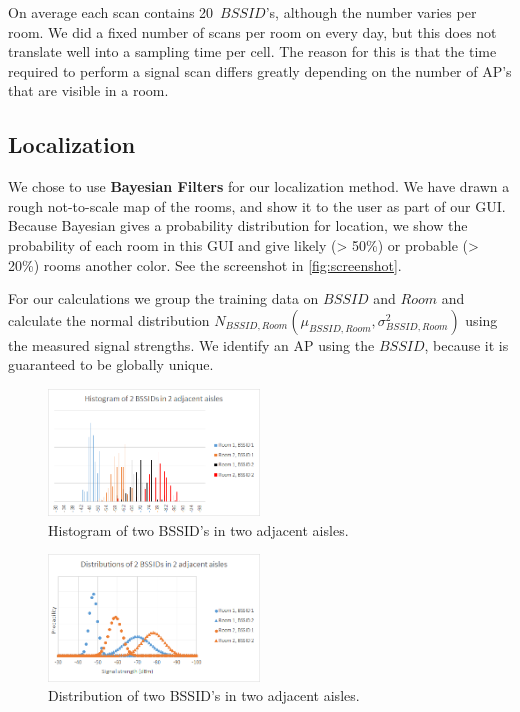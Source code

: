 \documentclass[a4paper,10pt,twoside]{IEEEtran}
\begin{document}
On average each scan contains 20~$BSSID$'s, although the number varies per room.
We did a fixed number of scans per room on every day, but this does not translate well into a sampling time per cell.
The reason for this is that the time required to perform a signal scan
differs greatly depending on the number of AP's that are visible in a room.

\subsection{Localization}
\label{sec:loc-data}

We chose to use \textbf{Bayesian Filters} for our localization method.
We have drawn a rough not-to-scale map of the rooms, and show it to the user as part of our GUI.
Because Bayesian gives a probability distribution for location, we show the probability of each room in this GUI and give likely (> 50\%) or probable (> 20\%) rooms another color.
See the screenshot in \autoref{fig:screenshot}.

For our calculations we group the training data on $BSSID$ and $Room$ and calculate the normal distribution $N_{BSSID,Room}(\mu_{BSSID,Room}, \sigma^2_{BSSID,Room})$ using the measured signal strengths. We identify an AP using the $BSSID$, because it is guaranteed to be globally unique.

\begin{figure}
  \centering
    \includegraphics[width=0.5\textwidth]{histogram}
    \caption{Histogram of two BSSID's in two adjacent aisles.}
    \label{fig:histogram}
\end{figure}

\begin{figure}
  \centering
    \includegraphics[width=0.5\textwidth]{distribution}
    \caption{Distribution of two BSSID's in two adjacent aisles.}
    \label{fig:distribution}
\end{figure}
\end{document}
